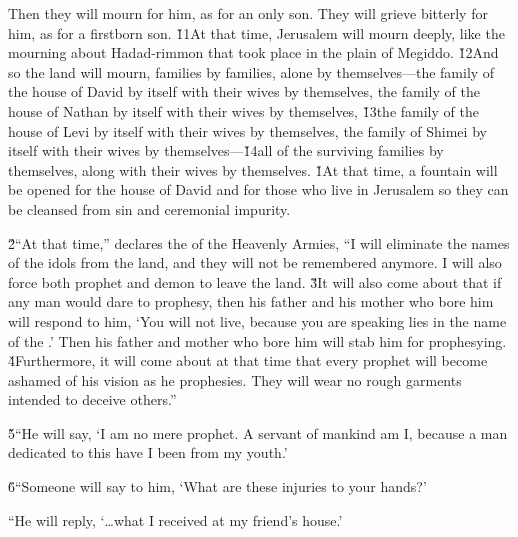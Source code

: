 Then they will mourn for him, as for an only son. They will grieve bitterly for him, as for a firstborn son. \v{11}At that time, Jerusalem will mourn deeply, like the mourning about Hadad-rimmon that took place in the plain of Megiddo. \v{12}And so the land will mourn, families by families, alone by themselves---the family of the house of David by itself with their wives by themselves, the family of the house of Nathan by itself with their wives by themselves, \v{13}the family of the house of Levi by itself with their wives by themselves, the family of Shimei by itself with their wives by themselves---\v{14}all of the surviving families by themselves, along with their wives by themselves.
\v{1}At that time, a fountain will be opened for the house of David and for those who live in Jerusalem so they can be cleansed from sin and ceremonial impurity.

\v{2}``At that time,'' declares the  of the Heavenly Armies, ``I will eliminate the names of the idols from the land, and they will not be remembered anymore. I will also force both prophet and demon to leave the land. \v{3}It will also come about that if any man would dare to prophesy, then his father and his mother who bore him will respond to him, `You will not live, because you are speaking lies in the name of the .' Then his father and mother who bore him will stab him for prophesying. \v{4}Furthermore, it will come about at that time that every prophet will become ashamed of his vision as he prophesies. They will wear no rough garments intended to deceive others.''

\v{5}``He will say, `I am no mere prophet. A servant of mankind am I, because a man dedicated to this have I been from my youth.'

\v{6}``Someone will say to him, `What are these injuries to your hands?'

``He will reply, `{\ldots}what I received at my friend's house.'

